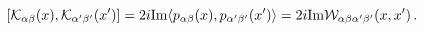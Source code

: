 \begin{equation}
\left[{\cal K}_{\alpha\beta}(x),{\cal
K}_{\alpha'\beta'}(x')\right]=2i \mbox{Im} \langle
p_{\alpha\beta}(x),p_{\alpha'\beta'}(x')\rangle=2i \mbox{Im}{\cal
W}_{\alpha\beta\alpha'\beta'}(x,x') \,.
\end{equation}

